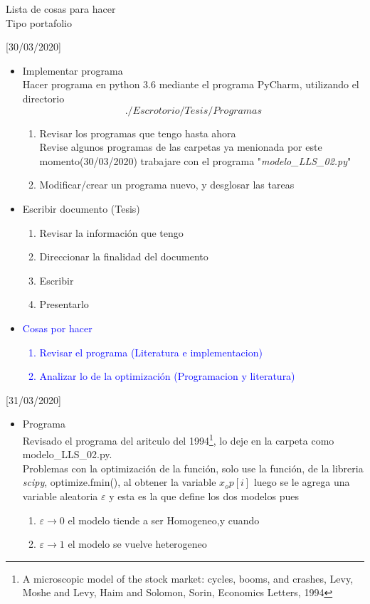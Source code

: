 \documentclass[a4paper,14pt]{article}
\begin{document}
\begin{center}
\begin{Huge}
Lista de cosas para hacer\\
Tipo portafolio 
\end{Huge}
\end{center}
[30/03/2020]

\begin{itemize}
\item Implementar programa\\
Hacer programa en python 3.6 mediante el programa PyCharm, utilizando el directorio
$$./Escrotorio/Tesis/Programas$$
\begin{enumerate}
\item Revisar los programas que tengo hasta ahora\\
Revise algunos programas de las carpetas ya menionada por este momento(30/03/2020) trabajare con el programa "\textit{modelo\_LLS\_02.py}" 

\item Modificar/crear un programa nuevo, y desglosar las tareas 
\end{enumerate}
\item Escribir documento (Tesis)
\begin{enumerate}
\item Revisar la información que tengo
\item Direccionar la finalidad del documento
\item Escribir
\item Presentarlo
\end{enumerate}
\item \textcolor{blue}{Cosas por hacer
\begin{enumerate}
\item Revisar el programa (Literatura e implementacion)
\item Analizar lo de la optimización (Programacion y literatura)
\end{enumerate}}
\end{itemize}
[31/03/2020]
\begin{itemize}
\item Programa\\
Revisado el programa del aritculo del 1994\footnote{A microscopic model of the stock market: cycles, booms, and crashes, Levy, Moshe and Levy, Haim and Solomon, Sorin, Economics Letters, 1994}, lo deje en la carpeta como modelo\_LLS\_02.py.\\
Problemas con la optimización de la función, solo use la función, de la libreria  \textit{scipy}, optimize.fmin(), al obtener la variable $x_op[i]$ luego se le agrega una variable aleatoria $\varepsilon$ y esta es la que define los dos modelos pues
\begin{enumerate}
\item $\varepsilon \rightarrow 0$ el modelo tiende a ser Homogeneo,y cuando
\item $\varepsilon \rightarrow 1$ el modelo se vuelve heterogeneo
\end{enumerate}
\end{itemize}
\end{document}
